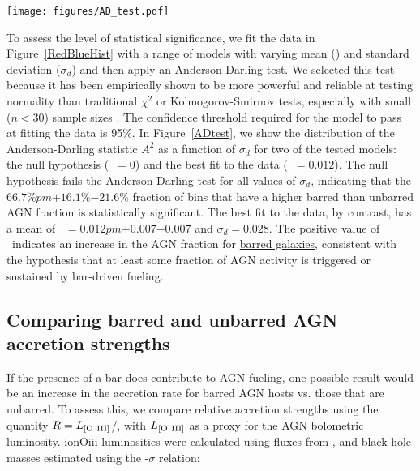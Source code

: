\begin{figure*}
\centering
\texttt{[image: figures/AD\_test.pdf]}
\caption{Fits of the binned fraction of barred vs. unbarred AGN fractions to a normal distribution. \textit{Left:} value of the Anderson-Darling test ($A^2$) as a function of the standard deviation of the normal distribution being fit ($\sigma_d$). The horizontal black line shows the critical value of $A^2$ corresponding to 95\%; a model must fall below this line to be considered an acceptable fit at this level of confidence. Two models are shown: the null hypothesis (blue diamonds) and the best fit to the data in Figure~\ref{RedBlueHist} (purple triangles). \textit{Right}: Plot of the minimum $A^2$ for the full range of means (\db) tested for the data. This shows that acceptable fits can be found for $0.005<$\db$<0.019$, but that the null hypothesis is ruled out at 95\% confidence.}
\label{ADtest}
\end{figure*}

To assess the level of statistical significance, we fit the data in Figure~\ref{RedBlueHist} with a range of models with varying mean (\db) and standard deviation ($\sigma_d$) and then apply an Anderson-Darling test. We selected this test because it has been empirically shown to be more powerful and reliable at testing normality than traditional $\chi^2$ or Kolmogorov-Smirnov tests, especially with small ($n<30$) sample sizes \citep{Hou2009}. The confidence threshold required for the model to pass at fitting the data is 95\%. In Figure~\ref{ADtest}, we show the distribution of the Anderson-Darling statistic $A^2$ as a function of $\sigma_d$ for two  of the tested models: the null hypothesis (\db~$=0$) and the best fit to the data (\db~$=0.012$). The null hypothesis fails the Anderson-Darling test for all values of $\sigma_d$, indicating that the $66.7\%pm{+16.1\%}{-21.6\%}$ fraction of bins that have a higher barred than unbarred AGN fraction is statistically significant. The best fit to the data, by contrast, has a mean of \db~$=0.012 pm {+0.007}{-0.007}$ and $\sigma_d=0.028$. The positive value of \db~indicates an increase in the AGN fraction for \underline{barred galaxies}, consistent with the hypothesis that at least some fraction of AGN activity is triggered or sustained by bar-driven fueling.



\subsection{Comparing barred and unbarred AGN accretion strengths}
\label{sec:Eddington Ratio}
If the presence of a bar does contribute to AGN fueling, one possible result would be an increase in the accretion rate for barred AGN hosts vs. those that are unbarred. To assess this, we compare relative accretion strengths using the quantity $R=L_{\rm{[O~III]}}$/\mbh, with $L_{\rm{[O~III]}}$ as a proxy for the AGN bolometric luminosity. ion{O}{iii} luminosities were calculated using fluxes from \citet{OSSY}, and black hole masses estimated using the \mbh-$\sigma$ relation:

